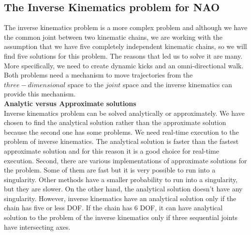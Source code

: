\subsection{The Inverse Kinematics problem for NAO}
The inverse kinematics problem is a more complex problem and although we have the common joint between two kinematic chains, we are working with the assumption that we have five completely independent kinematic chains, so we will find five solutions for this problem. The reasons that led us to solve it are many. More specifically, we need to create dynamic kicks and an omni-directional walk. Both problems need a mechanism to move trajectories from the \(three-dimensional\) space to the \(joint\) space and the inverse kinematics can provide this mechanism.\\
\textbf{Analytic versus Approximate solutions}\\
Inverse kinematics problem can be solved analytically or approximately. We have chosen to find the analytical solution rather than the approximate solution because the second one has some problems. We need real-time execution to the problem of inverse kinematics. The analytical solution is faster than the fastest approximate solution and for this reason it is a good choice for real-time execution. Second, there are various implementations of approximate solutions for the problem. Some of them are fast but it is very possible to run into a singularity. Other methods have a smaller probability to run into a singularity, but they are slower. On the other hand, the analytical solution doesn't have any singularity. However, inverse kinematics have an analytical solution only if the chain has five or less DOF. If the chain has 6 DOF, it can have analytical solution to the problem of the inverse kinematics only if three sequential joints have intersecting axes.


